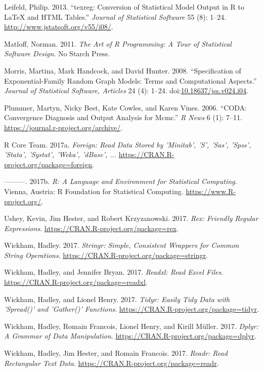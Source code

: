 \documentclass[]{book}
\theoremstyle{definition}
\theoremstyle{definition}
\theoremstyle{definition}
\theoremstyle{remark}
\begin{document}
\hypertarget{ref-R-texreg}{}
Leifeld, Philip. 2013. ``texreg: Conversion of Statistical Model Output
in R to LaTeX and HTML Tables.'' \emph{Journal of Statistical Software}
55 (8): 1--24. \url{http://www.jstatsoft.org/v55/i08/}.

\hypertarget{ref-Matloff2011}{}
Matloff, Norman. 2011. \emph{The Art of R Programming: A Tour of
Statistical Software Design}. No Starch Press.

\hypertarget{ref-Morris2008}{}
Morris, Martina, Mark Handcock, and David Hunter. 2008. ``Specification
of Exponential-Family Random Graph Models: Terms and Computational
Aspects.'' \emph{Journal of Statistical Software, Articles} 24 (4):
1--24.
doi:\href{https://doi.org/10.18637/jss.v024.i04}{10.18637/jss.v024.i04}.

\hypertarget{ref-R-coda}{}
Plummer, Martyn, Nicky Best, Kate Cowles, and Karen Vines. 2006. ``CODA:
Convergence Diagnosis and Output Analysis for Mcmc.'' \emph{R News} 6
(1): 7--11. \url{https://journal.r-project.org/archive/}.

\hypertarget{ref-R-foreign}{}
R Core Team. 2017a. \emph{Foreign: Read Data Stored by 'Minitab', 'S',
'Sas', 'Spss', 'Stata', 'Systat', 'Weka', 'dBase', ...}
\url{https://CRAN.R-project.org/package=foreign}.

\hypertarget{ref-R}{}
---------. 2017b. \emph{R: A Language and Environment for Statistical
Computing}. Vienna, Austria: R Foundation for Statistical Computing.
\url{https://www.R-project.org/}.

\hypertarget{ref-R-rex}{}
Ushey, Kevin, Jim Hester, and Robert Krzyzanowski. 2017. \emph{Rex:
Friendly Regular Expressions}.
\url{https://CRAN.R-project.org/package=rex}.

\hypertarget{ref-R-stringr}{}
Wickham, Hadley. 2017. \emph{Stringr: Simple, Consistent Wrappers for
Common String Operations}.
\url{https://CRAN.R-project.org/package=stringr}.

\hypertarget{ref-R-readxl}{}
Wickham, Hadley, and Jennifer Bryan. 2017. \emph{Readxl: Read Excel
Files}. \url{https://CRAN.R-project.org/package=readxl}.

\hypertarget{ref-R-tidyr}{}
Wickham, Hadley, and Lionel Henry. 2017. \emph{Tidyr: Easily Tidy Data
with 'Spread()' and 'Gather()' Functions}.
\url{https://CRAN.R-project.org/package=tidyr}.

\hypertarget{ref-R-dplyr}{}
Wickham, Hadley, Romain Francois, Lionel Henry, and Kirill Müller. 2017.
\emph{Dplyr: A Grammar of Data Manipulation}.
\url{https://CRAN.R-project.org/package=dplyr}.

\hypertarget{ref-R-readr}{}
Wickham, Hadley, Jim Hester, and Romain Francois. 2017. \emph{Readr:
Read Rectangular Text Data}.
\url{https://CRAN.R-project.org/package=readr}.
\end{document}
